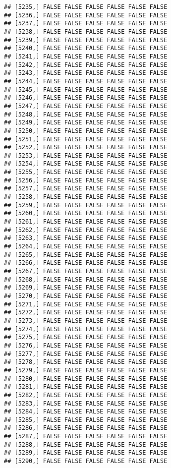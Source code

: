 \documentclass[
]{article}
\begin{document}
\begin{verbatim}
## [5235,] FALSE FALSE FALSE FALSE FALSE FALSE
## [5236,] FALSE FALSE FALSE FALSE FALSE FALSE
## [5237,] FALSE FALSE FALSE FALSE FALSE FALSE
## [5238,] FALSE FALSE FALSE FALSE FALSE FALSE
## [5239,] FALSE FALSE FALSE FALSE FALSE FALSE
## [5240,] FALSE FALSE FALSE FALSE FALSE FALSE
## [5241,] FALSE FALSE FALSE FALSE FALSE FALSE
## [5242,] FALSE FALSE FALSE FALSE FALSE FALSE
## [5243,] FALSE FALSE FALSE FALSE FALSE FALSE
## [5244,] FALSE FALSE FALSE FALSE FALSE FALSE
## [5245,] FALSE FALSE FALSE FALSE FALSE FALSE
## [5246,] FALSE FALSE FALSE FALSE FALSE FALSE
## [5247,] FALSE FALSE FALSE FALSE FALSE FALSE
## [5248,] FALSE FALSE FALSE FALSE FALSE FALSE
## [5249,] FALSE FALSE FALSE FALSE FALSE FALSE
## [5250,] FALSE FALSE FALSE FALSE FALSE FALSE
## [5251,] FALSE FALSE FALSE FALSE FALSE FALSE
## [5252,] FALSE FALSE FALSE FALSE FALSE FALSE
## [5253,] FALSE FALSE FALSE FALSE FALSE FALSE
## [5254,] FALSE FALSE FALSE FALSE FALSE FALSE
## [5255,] FALSE FALSE FALSE FALSE FALSE FALSE
## [5256,] FALSE FALSE FALSE FALSE FALSE FALSE
## [5257,] FALSE FALSE FALSE FALSE FALSE FALSE
## [5258,] FALSE FALSE FALSE FALSE FALSE FALSE
## [5259,] FALSE FALSE FALSE FALSE FALSE FALSE
## [5260,] FALSE FALSE FALSE FALSE FALSE FALSE
## [5261,] FALSE FALSE FALSE FALSE FALSE FALSE
## [5262,] FALSE FALSE FALSE FALSE FALSE FALSE
## [5263,] FALSE FALSE FALSE FALSE FALSE FALSE
## [5264,] FALSE FALSE FALSE FALSE FALSE FALSE
## [5265,] FALSE FALSE FALSE FALSE FALSE FALSE
## [5266,] FALSE FALSE FALSE FALSE FALSE FALSE
## [5267,] FALSE FALSE FALSE FALSE FALSE FALSE
## [5268,] FALSE FALSE FALSE FALSE FALSE FALSE
## [5269,] FALSE FALSE FALSE FALSE FALSE FALSE
## [5270,] FALSE FALSE FALSE FALSE FALSE FALSE
## [5271,] FALSE FALSE FALSE FALSE FALSE FALSE
## [5272,] FALSE FALSE FALSE FALSE FALSE FALSE
## [5273,] FALSE FALSE FALSE FALSE FALSE FALSE
## [5274,] FALSE FALSE FALSE FALSE FALSE FALSE
## [5275,] FALSE FALSE FALSE FALSE FALSE FALSE
## [5276,] FALSE FALSE FALSE FALSE FALSE FALSE
## [5277,] FALSE FALSE FALSE FALSE FALSE FALSE
## [5278,] FALSE FALSE FALSE FALSE FALSE FALSE
## [5279,] FALSE FALSE FALSE FALSE FALSE FALSE
## [5280,] FALSE FALSE FALSE FALSE FALSE FALSE
## [5281,] FALSE FALSE FALSE FALSE FALSE FALSE
## [5282,] FALSE FALSE FALSE FALSE FALSE FALSE
## [5283,] FALSE FALSE FALSE FALSE FALSE FALSE
## [5284,] FALSE FALSE FALSE FALSE FALSE FALSE
## [5285,] FALSE FALSE FALSE FALSE FALSE FALSE
## [5286,] FALSE FALSE FALSE FALSE FALSE FALSE
## [5287,] FALSE FALSE FALSE FALSE FALSE FALSE
## [5288,] FALSE FALSE FALSE FALSE FALSE FALSE
## [5289,] FALSE FALSE FALSE FALSE FALSE FALSE
## [5290,] FALSE FALSE FALSE FALSE FALSE FALSE

\end{verbatim}
\end{document}
